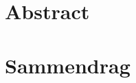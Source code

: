\par\break\null%
\vsize%
{\centering\section*{Abstract}}

\lorem{}

\vfill%
{\centering\section*{Sammendrag}}

\lorem{}

\vfill\break%
